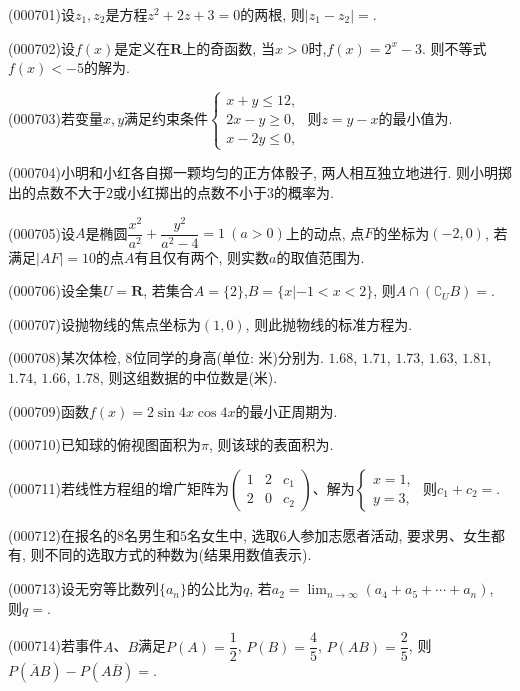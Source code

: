 \item (000701)设$z_1,z_2$是方程$z^2+2z+3=0$的两根, 则$|z_1-z_2|=$.
\item (000702)设$f(x)$是定义在$\mathbf{R}$上的奇函数, 当$x>0$时,$f(x)=2^x-3$. 则不等式$f(x)<-5$的解为.
\item (000703)若变量$x,y$满足约束条件$\begin{cases} x+y\le 12, \\ 2x-y\ge 0,  \\ x-2y\le 0, \end{cases}$ 则$z=y-x$的最小值为.
\item (000704)小明和小红各自掷一颗均匀的正方体骰子, 两人相互独立地进行. 则小明掷出的点数不大于$2$或小红掷出的点数不小于$3$的概率为.
\item (000705)设$A$是椭圆$\dfrac{x^2}{a^2}+\dfrac{y^2}{a^2-4}=1 \ (a>0)$上的动点, 点$F$的坐标为$(-2,0)$, 若满足$|AF|=10$的点$A$有且仅有两个, 则实数$a$的取值范围为.
\item (000706)设全集$U=\mathbf{R}$, 若集合$A=\{2\}$,$B=\{x|-1<x<2\}$, 则$A\cap (\complement_UB)=$.
\item (000707)设抛物线的焦点坐标为$(1,0)$, 则此抛物线的标准方程为.
\item (000708)某次体检, $8$位同学的身高(单位: 米)分别为. $1.68$, $1.71$, $1.73$, $1.63$, $1.81$, $1.74$, $1.66$, $1.78$, 则这组数据的中位数是(米).
\item (000709)函数$f(x)=2\sin 4x \cos 4x$的最小正周期为.
\item (000710)已知球的俯视图面积为$\pi$, 则该球的表面积为.
\item (000711)若线性方程组的增广矩阵为$\begin{pmatrix} 1 & 2 & c_1 \\ 2 & 0 & c_2\end{pmatrix}$、解为$\begin{cases}x=1, \\ y=3,\end{cases}$ 则$c_1+c_2=$.
\item (000712)在报名的$8$名男生和$5$名女生中, 选取$6$人参加志愿者活动, 要求男、女生都有, 则不同的选取方式的种数为(结果用数值表示).
\item (000713)设无穷等比数列$\{a_n\}$的公比为$q$, 若$a_2=\displaystyle\lim_{n\to\infty}(a_4+a_5+\cdots+a_n)$, 则$q=$.
\item (000714)若事件$A$、$B$满足$P(A)=\dfrac12$, $P(B)=\dfrac45$, $P(AB)=\dfrac25$, 则$P(\overline A B)-P(A\overline B)=$.
